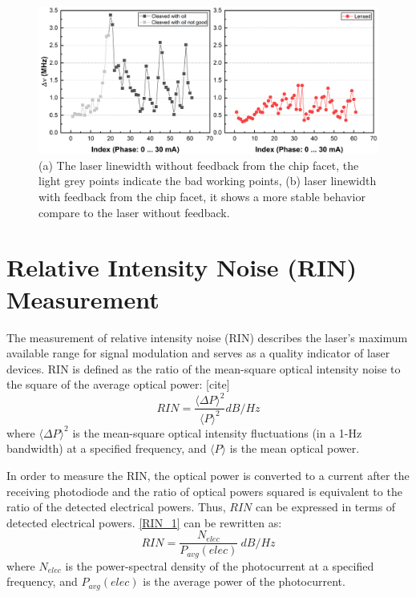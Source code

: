 \begin{figure}[ht]
    \centering
    \includegraphics[width=\linewidth]{figures/LB_Cleaved_and_Lensed.png}
    \caption{(a) The laser linewidth without feedback from the chip facet, the light grey points indicate the bad working points, (b) laser linewidth with feedback from the chip facet, it shows a more stable behavior compare to the laser without feedback.}
    \label{fig:LB_Cleaved_and_Lensed}
\end{figure}

\section{Relative Intensity Noise (RIN) Measurement}\label{sec:RIN_measurement}
The measurement of relative intensity noise (RIN) describes the laser’s maximum available range for signal modulation and serves as a quality indicator of laser devices. RIN is defined as the ratio of the mean-square optical intensity noise to the square of the average optical power: [cite]
\begin{equation}
    RIN=\frac{\langle \Delta P \rangle ^2}{\langle P \rangle ^2}dB/Hz
\label{RIN_1}
\end{equation}
where $\langle \Delta P \rangle ^2$ is the mean-square optical intensity fluctuations (in a 1-Hz bandwidth) at a specified frequency, and $\langle P \rangle$ is the mean optical power.

In order to measure the RIN, the optical power is converted to a current after the receiving photodiode and the ratio of optical powers squared is equivalent to the ratio of the detected electrical powers. Thus, $RIN$ can be expressed in terms of detected electrical powers. \autoref{RIN_1} can be rewritten as:
\begin{equation}
    RIN=\frac{N_{elec}}{P_{avg}(elec)} \ dB/Hz
    \label{eq:RIN_2}
\end{equation}
where $N_{elec}$ is the power-spectral density of the photocurrent at a specified frequency, and $P_{avg}(elec)$ is the average power of the photocurrent.

